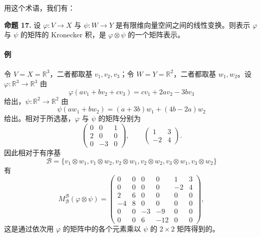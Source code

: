用这个术语，我们有：

\noindent\textbf{命题 17.} 设 $\varphi:V\to X$ 与 $\psi:W\to Y$ 是有限维向量空间之间的线性变换。则表示 $\varphi$ 与 $\psi$ 的矩阵的 Kronecker 积，是 $\varphi\otimes\psi$ 的一个矩阵表示。

\paragraph{例}
令 $V=X=\mathbb R^3$，二者都取基 $v_1,v_2,v_3$；令 $W=Y=\mathbb R^2$，二者都取基 $w_1,w_2$。设 $\varphi:\mathbb R^3\to\mathbb R^3$ 由
\[
\varphi(av_1+bv_2+cv_3)=cv_1+2av_2-3bv_3
\]
给出，$\psi:\mathbb R^2\to\mathbb R^2$ 由
\[
\psi(aw_1+bw_2)=(a+3b)w_1+(4b-2a)w_2
\]
给出。相对于所选基，$\varphi$ 与 $\psi$ 的矩阵分别为
\[
\begin{pmatrix}
0&0&1\\
2&0&0\\
0&-3&0
\end{pmatrix},
\qquad
\begin{pmatrix}
1&3\\
-2&4
\end{pmatrix}.
\]
因此相对于有序基
\[
\mathcal B=\{v_1\otimes w_1,
 v_1\otimes w_2,
 v_2\otimes w_1,
 v_2\otimes w_2,
 v_3\otimes w_1,
 v_3\otimes w_2\}
\]
有
\[
M_{\mathcal B}^{\mathcal B}(\varphi\otimes\psi)=
\begin{pmatrix}
0&0&0&0&1&3\\
0&0&0&0&-2&4\\
2&6&0&0&0&0\\
-4&8&0&0&0&0\\
0&0&-3&-9&0&0\\
0&0&6&-12&0&0
\end{pmatrix},
\]
这是通过依次用 $\varphi$ 的矩阵中的各个元素乘以 $\psi$ 的 $2\times2$ 矩阵得到的。

